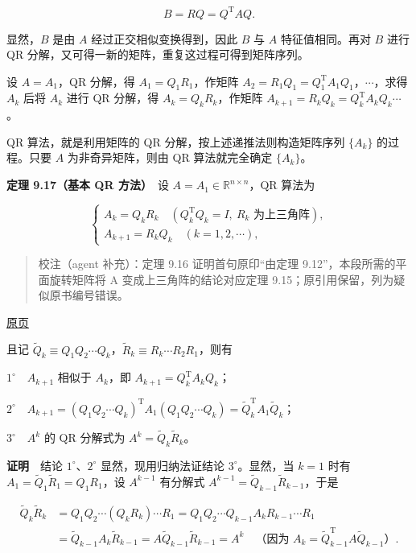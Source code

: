 \documentclass[
  10pt,
  fontset=fandol]{ctexart}
\begin{document}
\[
B=RQ=Q^{\mathrm T}AQ.
\]

显然，\(B\) 是由 \(A\) 经过正交相似变换得到，因此 \(B\) 与 \(A\) 特征值相同。再对 \(B\) 进行 QR 分解，又可得一新的矩阵，重复这过程可得到矩阵序列。

设 \(A=A_1\)，QR 分解，得 \(A_1=Q_1R_1\)，作矩阵 \(A_2=R_1Q_1=Q_1^{\mathrm T}A_1Q_1\)，\(\cdots\)，求得 \(A_k\) 后将 \(A_k\) 进行 QR 分解，得 \(A_k=Q_kR_k\)，作矩阵 \(A_{k+1}=R_kQ_k=Q_k^{\mathrm T}A_kQ_k\cdots\)。

QR 算法，就是利用矩阵的 QR 分解，按上述递推法则构造矩阵序列 \(\{A_k\}\) 的过程。只要 \(A\) 为非奇异矩阵，则由 QR 算法就完全确定 \(\{A_k\}\)。

\textbf{定理 9.17（基本 QR 方法）}　设 \(A=A_1\in\mathbb R^{n\times n}\)，QR 算法为

\[
\begin{cases}
A_k=Q_kR_k\quad(Q_k^{\mathrm T}Q_k=I,\ R_k\text{ 为上三角阵}),\\
A_{k+1}=R_kQ_k\quad(k=1,2,\cdots),
\end{cases}
\tag{9.4.8}
\]

\begin{quote}
校注（agent 补充）：定理 9.16 证明首句原印``由定理 9.12''，本段所需的平面旋转矩阵将 A 变成上三角阵的结论对应定理 9.15；原引用保留，列为疑似原书编号错误。
\end{quote}

\href{../../source-images/pdf-253.jpeg}{原页}

且记 \(\widetilde Q_k\equiv Q_1Q_2\cdots Q_k\)，\(\widetilde R_k\equiv R_k\cdots R_2R_1\)，则有

\(1^\circ\)　\(A_{k+1}\) 相似于 \(A_k\)，即 \(A_{k+1}=Q_k^{\mathrm T}A_kQ_k\)；

\(2^\circ\)　\(A_{k+1}=(Q_1Q_2\cdots Q_k)^{\mathrm T}A_1(Q_1Q_2\cdots Q_k)=\widetilde Q_k^{\mathrm T}A_1\widetilde Q_k\)；

\(3^\circ\)　\(A^k\) 的 QR 分解式为 \(A^k=\widetilde Q_k\widetilde R_k\)。

\textbf{证明}　结论 \(1^\circ\)、\(2^\circ\) 显然，现用归纳法证结论 \(3^\circ\)。显然，当 \(k=1\) 时有 \(A_1=\widetilde Q_1\widetilde R_1=Q_1R_1\)，设 \(A^{k-1}\) 有分解式 \(A^{k-1}=\widetilde Q_{k-1}\widetilde R_{k-1}\)，于是

\[
\begin{aligned}
\widetilde Q_k\widetilde R_k
&=Q_1Q_2\cdots(Q_kR_k)\cdots R_1
=Q_1Q_2\cdots Q_{k-1}A_kR_{k-1}\cdots R_1\\
&=\widetilde Q_{k-1}A_k\widetilde R_{k-1}
=A\widetilde Q_{k-1}\widetilde R_{k-1}=A^k
\quad\text{（因为 }A_k=\widetilde Q_{k-1}^{\mathrm T}A\widetilde Q_{k-1}\text{）}.
\end{aligned}
\]
\end{document}
